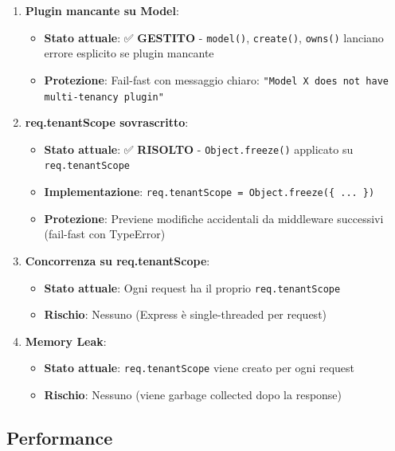 \documentclass[11pt,a4paper]{article}
\begin{document}
\begin{enumerate}
    \item \textbf{Plugin mancante su Model}:
    \begin{itemize}
        \item \textbf{Stato attuale}: ✅ \textbf{GESTITO} - \texttt{model()}, \texttt{create()}, \texttt{owns()} lanciano errore esplicito se plugin mancante
        \item \textbf{Protezione}: Fail-fast con messaggio chiaro: \texttt{"Model X does not have multi-tenancy plugin"}
    \end{itemize}
    
    \item \textbf{req.tenantScope sovrascritto}:
    \begin{itemize}
        \item \textbf{Stato attuale}: ✅ \textbf{RISOLTO} - \texttt{Object.freeze()} applicato su \texttt{req.tenantScope}
        \item \textbf{Implementazione}: \texttt{req.tenantScope = Object.freeze(\{ ... \})}
        \item \textbf{Protezione}: Previene modifiche accidentali da middleware successivi (fail-fast con TypeError)
    \end{itemize}
    
    \item \textbf{Concorrenza su req.tenantScope}:
    \begin{itemize}
        \item \textbf{Stato attuale}: Ogni request ha il proprio \texttt{req.tenantScope}
        \item \textbf{Rischio}: Nessuno (Express è single-threaded per request)
    \end{itemize}
    
    \item \textbf{Memory Leak}:
    \begin{itemize}
        \item \textbf{Stato attuale}: \texttt{req.tenantScope} viene creato per ogni request
        \item \textbf{Rischio}: Nessuno (viene garbage collected dopo la response)
    \end{itemize}
\end{enumerate}

\subsection{Performance}
\end{document}
